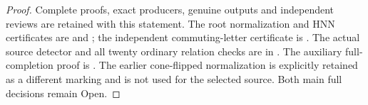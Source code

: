 \begin{proof}
Complete proofs, exact producers, genuine outputs and independent
reviews are retained with this statement. The root normalization
and HNN certificates are
 and
; the independent commuting-letter
certificate is
.
The actual source detector and all twenty ordinary relation checks
are in
.
The auxiliary full-completion proof is
.
The earlier cone-flipped normalization is explicitly retained as a
different marking and is not used for the selected source. Both main
full decisions remain Open.
\end{proof}
